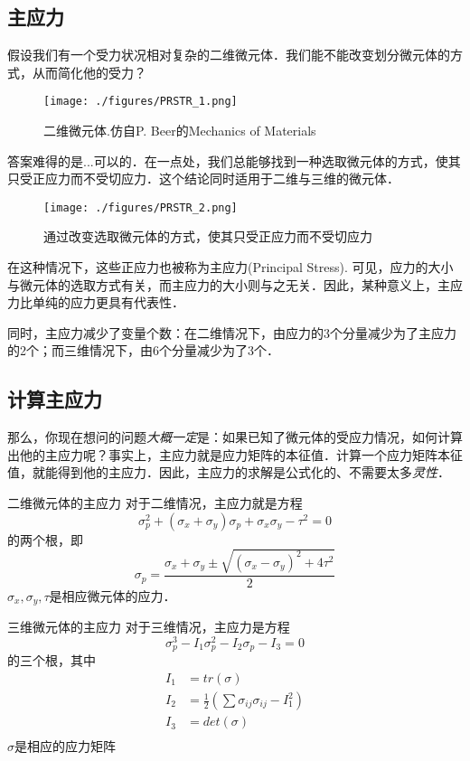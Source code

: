 
\begin{issues}
\issueDraft
\end{issues}

\subsection{主应力}
假设我们有一个受力状况相对复杂的二维微元体．我们能不能改变划分微元体的方式，从而简化他的受力？
\begin{figure}[ht]
\centering
\texttt{[image: ./figures/PRSTR\_1.png]}
\caption{二维微元体.仿自P. Beer的Mechanics of Materials} \label{PRSTR_fig1}
\end{figure}

答案难得的是...可以的．在一点处，我们总能够找到一种选取微元体的方式，使其只受正应力而不受切应力．这个结论同时适用于二维与三维的微元体．
\begin{figure}[ht]
\centering
\texttt{[image: ./figures/PRSTR\_2.png]}
\caption{通过改变选取微元体的方式，使其只受正应力而不受切应力} \label{PRSTR_fig2}
\end{figure}
在这种情况下，这些正应力也被称为主应力(Principal Stress). 可见，应力的大小与微元体的选取方式有关，而主应力的大小则与之无关．因此，某种意义上，主应力比单纯的应力更具有代表性．

同时，主应力减少了变量个数：在二维情况下，由应力的3个分量减少为了主应力的2个；而三维情况下，由6个分量减少为了3个．

\subsection{计算主应力}

那么，你现在想问的问题\textsl{大概一定}是：如果已知了微元体的受应力情况，如何计算出他的主应力呢？事实上，主应力就是应力矩阵的本征值．计算一个应力矩阵本征值，就能得到他的主应力．因此，主应力的求解是公式化的、不需要太多\textsl{灵性}．

\begin{example}{二维微元体的主应力}
对于二维情况，主应力就是方程
$$\sigma_p^2+(\sigma_x+\sigma_y)\sigma_p+\sigma_x\sigma_y-\tau^2=0$$
的两个根，即
$$\sigma_p=\frac{\sigma_x+\sigma_y \pm \sqrt{(\sigma_x-\sigma_y)^2+4\tau^2}}{2}$$
$\sigma_x,\sigma_y,\tau$是相应微元体的应力．
\end{example}

\begin{example}{三维微元体的主应力}
对于三维情况，主应力是方程 
$$
\sigma_p^3-I_1\sigma_p^2-I_2\sigma_p-I_3=0
$$
的三个根，其中
$$
\begin{aligned}
I_1&=tr(\sigma)\\
I_2&=\frac{1}{2} ({\sum \sigma_{ij} \sigma_{ij} -I_1^2})\\
I_3&=det(\sigma)\\
\end{aligned}
$$
$\sigma$是相应的应力矩阵
\end{example}
